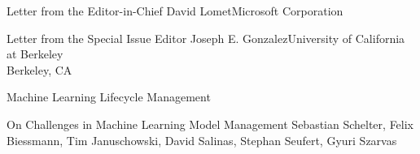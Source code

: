 \documentclass[11pt]{article}
\begin{document}


\begin{bulletin}

%
%

\begin{lettersection}


\begin{letter}{Letter from the Editor-in-Chief}
{David Lomet}{Microsoft Corporation}

\end{letter}
%
\newpage
%
%
\begin{letter}{Letter from the Special Issue Editor}
{Joseph E. Gonzalez}{University of California at Berkeley\\ Berkeley, CA}

\end{letter}

\end{lettersection}



\begin{articlesection}{Machine Learning Lifecycle Management}
%
%
%
\begin{article}
{On Challenges in Machine Learning Model Management}
{Sebastian Schelter, Felix Biessmann, Tim Januschowski, David Salinas, Stephan Seufert, Gyuri Szarvas}
\graphicspath{{submissions/AmazonModelManagement/figs/}}

\end{article}



\end{articlesection}
\end{bulletin}
\end{document}
